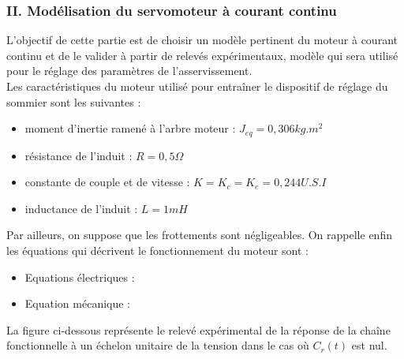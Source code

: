\subsubsection{II. Mod\'elisation du servomoteur \`a courant continu}
L'objectif de cette partie est de choisir un mod\`ele pertinent du moteur \`a courant continu et de le
valider \`a partir de relev\'es exp\'erimentaux, mod\`ele qui sera utilis\'e pour le r\'eglage des param\`etres de
l'asservissement.\\
Les caract\'eristiques du moteur utilis\'e pour entra\^iner le dispositif de r\'eglage du sommier sont les
suivantes :
\begin{itemize}
\item moment d'inertie ramen\'e \`a l'arbre moteur : $J_{eq} = 0,306 kg.m^2$
\item r\'esistance de l'induit : $R=0,5 \Omega$
\item constante de couple et de vitesse : $K=K_c = K_e = 0,244 U.S.I$
\item inductance de l'induit : $L=1 mH$
\end{itemize}
Par ailleurs, on suppose que les frottements sont n\'egligeables. On rappelle enfin les \'equations qui d\'ecrivent le fonctionnement du moteur sont :
\begin{itemize}
\item Equations \'electriques :
\item Equation m\'ecanique :
\end{itemize}
La figure ci-dessous repr\'esente le relev\'e exp\'erimental de la r\'eponse de la cha\^ine fonctionnelle \`a un
\'echelon unitaire de la tension dans le cas o\`u $C_r(t)$ est nul.

